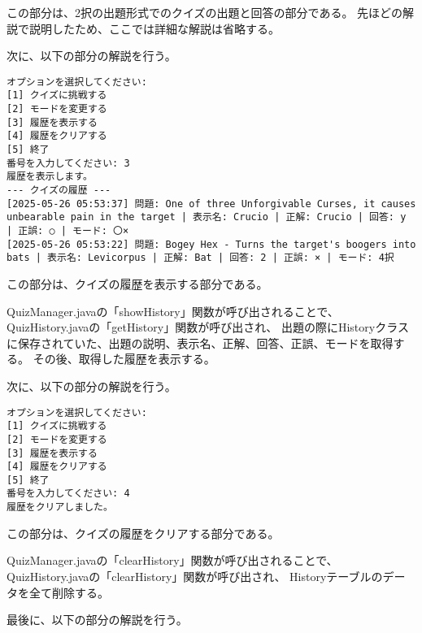 \documentclass[uplatex,dvipdfmx,a4paper]{jsarticle}
\begin{document}
\par この部分は、2択の出題形式でのクイズの出題と回答の部分である。
先ほどの解説で説明したため、ここでは詳細な解説は省略する。
\par 次に、以下の部分の解説を行う。
\begin{lstlisting}[style=result]
  オプションを選択してください:
[1] クイズに挑戦する
[2] モードを変更する
[3] 履歴を表示する
[4] 履歴をクリアする
[5] 終了
番号を入力してください: 3
履歴を表示します。
--- クイズの履歴 ---
[2025-05-26 05:53:37] 問題: One of three Unforgivable Curses, it causes unbearable pain in the target | 表示名: Crucio | 正解: Crucio | 回答: y | 正誤: ○ | モード: 〇×
[2025-05-26 05:53:22] 問題: Bogey Hex - Turns the target's boogers into bats | 表示名: Levicorpus | 正解: Bat | 回答: 2 | 正誤: × | モード: 4択
\end{lstlisting}
\par この部分は、クイズの履歴を表示する部分である。
\par QuizManager.javaの「showHistory」関数が呼び出されることで、QuizHistory.javaの「getHistory」関数が呼び出され、
出題の際にHistoryクラスに保存されていた、出題の説明、表示名、正解、回答、正誤、モードを取得する。
その後、取得した履歴を表示する。
\par 次に、以下の部分の解説を行う。
\begin{lstlisting}[style=result]
  オプションを選択してください:
[1] クイズに挑戦する
[2] モードを変更する
[3] 履歴を表示する
[4] 履歴をクリアする
[5] 終了
番号を入力してください: 4
履歴をクリアしました。
\end{lstlisting}
\par この部分は、クイズの履歴をクリアする部分である。
\par QuizManager.javaの「clearHistory」関数が呼び出されることで、QuizHistory.javaの「clearHistory」関数が呼び出され、
Historyテーブルのデータを全て削除する。
\par 最後に、以下の部分の解説を行う。
\end{document}
